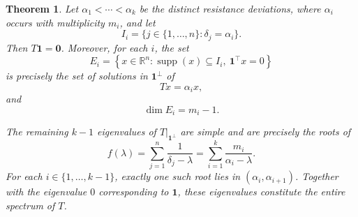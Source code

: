 \documentclass[12pt,a4paper]{amsart}
\newtheorem{theorem}{Theorem}[section]
\theoremstyle{remark}
\theoremstyle{definition}
\newcommand{\1}{\mathbf{1}}
\newcommand{\0}{\mathbf{0}}
\begin{document}
\begin{theorem}\label{thm:spectrumT}
Let $\alpha_1<\cdots<\alpha_k$ be the distinct resistance deviations,
where $\alpha_i$ occurs with multiplicity $m_i$, and let
\[
I_i=\{j\in\{1,\ldots,n\}:\delta_j=\alpha_i\}.
\]
Then $T\mathbf{1}=\mathbf{0}$. Moreover, for each $i$, the set
\[
E_i=
\left\{
x\in\mathbb{R}^n:
\operatorname{supp}(x)\subseteq I_i,\ 
\mathbf{1}^{\top}x=0
\right\}
\]
is precisely the set of solutions in $\mathbf{1}^{\perp}$ of
\[
Tx=\alpha_i x,
\]
and
\[
\dim E_i=m_i-1.
\]

The remaining $k-1$ eigenvalues of
$\left.T\right|_{\mathbf{1}^{\perp}}$ are simple and are precisely the
roots of
\[
f(\lambda)
=
\sum_{j=1}^{n}\frac{1}{\delta_j-\lambda}
=
\sum_{i=1}^{k}\frac{m_i}{\alpha_i-\lambda}.
\]
For each $i\in\{1,\ldots,k-1\}$, exactly one such root lies in
$(\alpha_i,\alpha_{i+1})$. Together with the eigenvalue $0$
corresponding to $\mathbf{1}$, these eigenvalues constitute the entire
spectrum of $T$.
\end{theorem}
\end{document}
